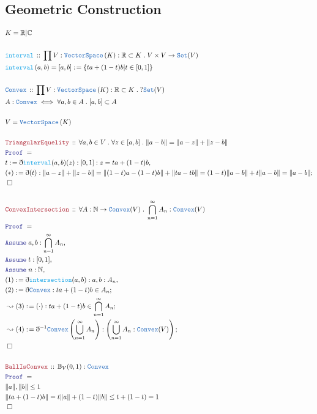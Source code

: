 \documentclass[12pt]{scrartcl}
\newcommand{\TYPE}[1]{\textcolor{NavyBlue}{\mathtt{#1}}}
\newcommand{\FUNC}[1]{\textcolor{Cerulean}{\mathtt{#1}}}
\newcommand{\LOGIC}[1]{\textcolor{Blue}{\mathtt{#1}}}
\newcommand{\THM}[1]{\textcolor{Maroon}{\mathtt{#1}}}
\renewcommand{\.}{\; . \;}
\newcommand{\de}{: \kern 0.1pc =}
\newcommand{\Act}[1]{\left( #1 \right)}
\newcommand{\Theorem}[2]{& \THM{#1} \, :: \, #2 \\ & \Proof = \\ }
\newcommand{\DeclareType}[2]{& \TYPE{#1} \, :: \, #2 \\}
\newcommand{\DefineType}[3]{& #1 : \TYPE{#2} \iff #3 \\}
\newcommand{\DeclareFunc}[2]{& \FUNC{#1} \, :: \, #2 \\}
\newcommand{\DefineNamedFunc}[4]{&  \FUNC{#1}\Act{#2} = #3 \de #4 \\}
\newcommand{\Page}[1]{\begin{align*} #1 \end{align*} \newpage   }
\newcommand{\Reals}{\mathbb{R} }
\newcommand{\Nat}{\mathbb{N} }
\newcommand{\Set}{\TYPE{Set}}
\newcommand{\Say}[3]{& #1 \de #2 : #3, \\}
\newcommand{\Conclude}[3]{& #1 \de #2 : #3; \\}
\newcommand{\DeriveConclude}[3]{& \leadsto #1 \de #2 : #3 ; \\}
\newcommand{\A}{\LOGIC{Assume} \;}
\newcommand{\Assume}[2]{& \A #1 : #2, \\}
\newcommand{\QED}{\; \square}
\newcommand{\EndProof}{& \QED \\}
\newcommand{\ByDef}{\eth}
\newcommand{\Proof}{\LOGIC{Proof} \; }
\newcommand{\VS}[1]{\TYPE{VectorSpace}\left( #1 \right)}
\begin{document}
\subsection{Geometric Construction}

\Page{
& K = \Reals | \mathbb{C}
\\ \\
\DeclareFunc{interval}{ \prod  V : \VS{K} : \Reals \subset K \. V \times V \to \Set(V)  }
\DefineNamedFunc{interval}{ a, b   }{[a,b]}{ \{ ta + (1 - t)b | t \in [0,1]   \} }
\\
\DeclareType{ Convex  }{ \prod V : \VS{K} : \Reals \subset K \. ?\Set(V) }
\DefineType{A}{ Convex  }{ \forall a,b \in A \. [a,b] \subset A     }
\\
& V = \VS{K} 
\\ \\
\Theorem{TriangularEquelity}{ \forall a, b \in V \. \forall z \in [a,b] \. \| a - b \| = \| a - z \| + \| z - b \|    }
\Say{t}{\ByDef\FUNC{interval}(a,b)(z)}{[0,1] : z = ta + (1 -t)b }
\Conclude{(*)}{ \ByDef(t)  }{ \| a - z \| + \| z - b \| = \| (1 -t) a  -(1 - t)b \| + \|  ta - tb  \| = (1 - t)\| a - b \| + t \|a - b \| = \|a - b \|  }
\EndProof
\\
\Theorem{ConvexIntersection}{ \forall A : \Nat \to \TYPE{Convex}(V) \. \bigcap^\infty_{n = 1} A_n : \TYPE{Convex}(V)  }
\Assume{a,b }{ \bigcap^\infty_{n = 1} A_n }
\Assume{t}{ [0,1] }
\Assume{ n  }{ \Nat }
\Say{ (1)  }{ \ByDef\FUNC{intersection}(a,b) }{ a,b : A_n }
\Conclude{  (2) }{ \ByDef \TYPE{Convex}  }{ ta + (1 - t)b \in A_n}
\DeriveConclude{ (3)  }{ (\cdot) }{  ta + (1 -t)b \in \bigcap^\infty_{n = 1} A_n }
\DeriveConclude{ (4)  }{ \ByDef^{-1}\TYPE{Convex}\left( \bigcup^\infty_{n = 1} A_n \right) }{ \left( \bigcup^\infty_{n = 1} A_n : \TYPE{Convex}(V)  \right) }
\EndProof
\\
\Theorem{BallIsConvex}{ \mathbb{B}_V (0,1)  : \TYPE{Convex}}
&  \| a \|, \| b \| \le   1        \\
&  \| ta + (1 - t)b \| = t\| a \| + (1 - t)\| b \|  \le t  + (1 - t) = 1 \\ 
\EndProof
}
\end{document}

